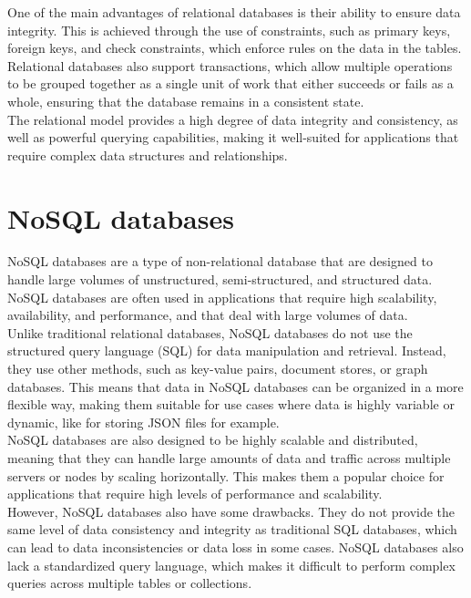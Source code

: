 \noindent
One of the main advantages of relational databases is their ability to ensure data integrity. This is achieved through the use of constraints, such as primary keys, foreign keys, and check constraints, which enforce rules on the data in the tables. Relational databases also support transactions, which allow multiple operations to be grouped together as a single unit of work that either succeeds or fails as a whole, ensuring that the database remains in a consistent state. \\

\noindent
The relational model provides a high degree of data integrity and consistency, as well as powerful querying capabilities, making it well-suited for applications that require complex data structures and relationships. \cite{ibm_relational_databases}

\section{NoSQL databases}
\label{sec:NoSQL-databases}

NoSQL databases are a type of non-relational database that are designed to handle large volumes of unstructured, semi-structured, and structured data. NoSQL databases are often used in applications that require high scalability, availability, and performance, and that deal with large volumes of data. \\

\noindent
Unlike traditional relational databases, NoSQL databases do not use the structured query language (SQL) for data manipulation and retrieval. Instead, they use other methods, such as key-value pairs, document stores, or graph databases. This means that data in NoSQL databases can be organized in a more flexible way, making them suitable for use cases where data is highly variable or dynamic, like for storing JSON files for example. \cite{Sisense_storing_json} \\

\noindent
NoSQL databases are also designed to be highly scalable and distributed, meaning that they can handle large amounts of data and traffic across multiple servers or nodes by scaling horizontally. This makes them a popular choice for applications that require high levels of performance and scalability. \\

\noindent
However, NoSQL databases also have some drawbacks. They do not provide the same level of data consistency and integrity as traditional SQL databases, which can lead to data inconsistencies or data loss in some cases. NoSQL databases also lack a standardized query language, which makes it difficult to perform complex queries across multiple tables or collections. \\

